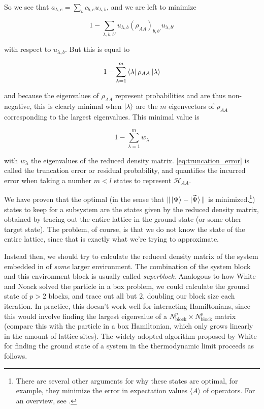So we see that $a_{\lambda, e} = \sum_{b} c_{b, e} u_{\lambda, b}$, and we are left to minimize

\begin{equation}
  1 - \sum_{\lambda, b, b'} u_{\lambda, b} (\rho_{AA})_{b, b'} u_{\lambda, b'}
\end{equation}

with respect to $u_{\lambda, b}$. But this is equal to

\begin{equation}
  1 - \sum_{\lambda = 1}^{m} \bra{\lambda} \rho_{AA} \ket{\lambda}
\end{equation}

and because the eigenvalues of $\rho_{AA}$ represent probabilities and are thus
non-negative, this is clearly minimal when $\ket{\lambda}$ are the $m$
eigenvectors of $\rho_{AA}$ corresponding to the largest eigenvalues. This minimal value is

\begin{equation}\label{eq:truncation_error}
  1 - \sum_{\lambda = 1}^{m} w_{\lambda}
\end{equation}

with $w_{\lambda}$ the eigenvalues of the reduced density matrix.
\eqref{eq:truncation_error} is called the truncation error or residual
probability, and quantifies the incurred error when taking a number $m < l$ states to
represent $\mathcal{H}_{AA}$.


We have proven that the optimal (in the sense that $\Vert \ket{\Psi}
- \ket{\widetilde{\Psi}} \Vert$ is minimized.\footnote{There are several other
arguments for why these states are optimal, for example, they minimize the
error in expectation values $\langle A \rangle$ of operators. For an overview,
see \cite{schollwock2005density}.}) states to keep for a subsystem are the
states given by the reduced density matrix, obtained by tracing out the entire
lattice in the ground state (or some other target state). The problem, of
course, is that we do not know the state of the entire lattice, since that is
exactly what we're trying to approximate. 

Instead then, we should try to calculate the reduced density matrix of the
system embedded in of \textit{some} larger environment. The combination of
the system block and this environment block is usually called
\textit{superblock}. Analogous to how White and Noack solved the particle
in a box problem, we could calculate the ground state of $p > 2$ blocks,
and trace out all but 2, doubling our block size each iteration. In
practice, this doesn't work well for interacting Hamiltonians, since this
would involve finding the largest eigenvalue of a $N_{\text{block}}^p
\times N_{\text{block}}^p$ matrix (compare this with the particle in a box
Hamiltonian, which only grows linearly in the amount of lattice sites).
The widely adopted algorithm proposed by White \cite{white1993density} for
finding the ground state of a system in the thermodynamic limit proceeds
as follows.


